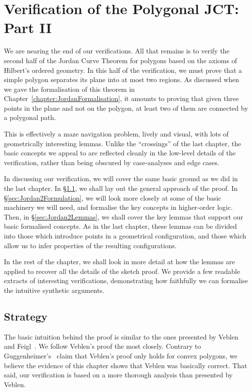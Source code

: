 \chapter{Verification of the Polygonal JCT: Part II}\label{chapter:JordanVerification2}
We are nearing the end of our verifications. All that remains is to verify the second half of the Jordan Curve Theorem for polygons based on the axioms of Hilbert's ordered geometry. In this half of the verification, we must prove that a simple polygon separates its plane into at most two regions. As discussed when we gave the formalisation of this theorem in Chapter~\ref{chapter:JordanFormalisation}, it amounts to proving that given three points in the plane and not on the polygon, at least two of them are connected by a polygonal path.

This is effectively a maze navigation problem, lively and visual, with lots of geometrically interesting lemmas. Unlike the ``crossings'' of the last chapter, the basic concepts we appeal to are reflected cleanly in the low-level details of the verification, rather than being obscured by case-analyses and edge cases.

In discussing our verification, we will cover the same basic ground as we did in the last chapter. In \S\ref{sec:SketchProofJordan2}, we shall lay out the general approach of the proof. In \S\ref{sec:Jordan2Formulation}, we will look more closely at some of the basic machinery we will need, and formalise the key concepts in higher-order logic. Then, in \S\ref{sec:Jordan2Lemmas}, we shall cover the key lemmas that support our basic formalised concepts. As in the last chapter, these lemmas can be divided into those which introduce points in a geometrical configuration, and those which allow us to infer properties of the resulting configurations. 

In the rest of the chapter, we shall look in more detail at how the lemmas are applied to recover all the details of the sketch proof. We provide a few readable extracts of interesting verifications, demonstrating how faithfully we can formalise the intuitive synthetic arguments.

\section{Strategy}\label{sec:SketchProofJordan2}
The basic intuition behind the proof is similar to the ones presented by Veblen~\cite{Veblenphd} and Feigl~\cite{FeiglJordan}. We follow Veblen's proof the most closely. Contrary to Guggenheimer's~\cite{GuggenheimerJordanCurve} claim that Veblen's proof only holds for convex polygons, we believe the evidence of this chapter shows that Veblen was basically correct. That said, our verification is based on a more thorough analysis than presented by Veblen.

